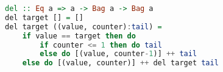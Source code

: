 \begin{lstlisting}[language=haskell]
del :: Eq a => a -> Bag a -> Bag a
del target [] = []
del target ((value, counter):tail) =
    if value == target then do
        if counter <= 1 then do tail
        else do [(value, counter-1)] ++ tail
    else do [(value, counter)] ++ del target tail
\end{lstlisting}